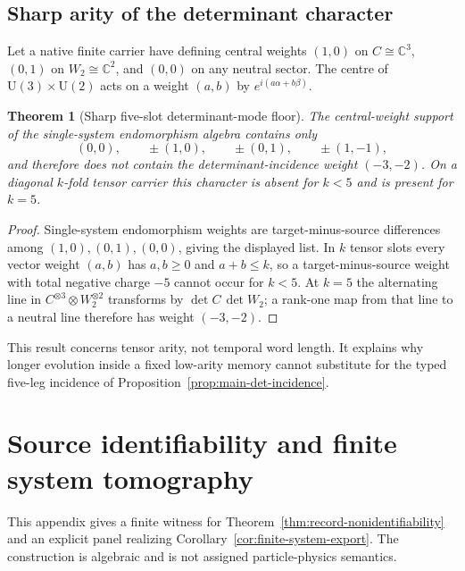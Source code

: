\documentclass[11pt]{article}
\newtheorem{theorem}{Theorem}[section]
\theoremstyle{definition}
\theoremstyle{remark}
\newcommand{\C}{\mathbb C}
\newcommand{\U}{\mathrm U}
\begin{document}
\subsection{Sharp arity of the determinant character}

Let a native finite carrier have defining central weights $(1,0)$ on
$C\cong\C^3$, $(0,1)$ on $W_2\cong\C^2$, and $(0,0)$ on any neutral sector.
The centre of $\U(3)\times\U(2)$ acts on a weight $(a,b)$ by
$e^{i(a\alpha+b\beta)}$.

\begin{theorem}[Sharp five-slot determinant-mode floor]
\label{thm:determinant-arity-floor}
The central-weight support of the single-system endomorphism algebra contains
only
\[
 (0,0),\qquad \pm(1,0),\qquad \pm(0,1),\qquad \pm(1,-1),
\]
and therefore does not contain the determinant-incidence weight $(-3,-2)$.
On a diagonal $k$-fold tensor carrier this character is absent for $k<5$ and
is present for $k=5$.
\end{theorem}

\begin{proof}
Single-system endomorphism weights are target-minus-source differences among
$(1,0),(0,1),(0,0)$, giving the displayed list.  In $k$ tensor slots every
vector weight $(a,b)$ has $a,b\ge0$ and $a+b\le k$, so a target-minus-source
weight with total negative charge $-5$ cannot occur for $k<5$.  At $k=5$ the
alternating line in $C^{\otimes3}\otimes W_2^{\otimes2}$ transforms by
$\det C\,\det W_2$; a rank-one map from that line to a neutral line therefore
has weight $(-3,-2)$.
\end{proof}

This result concerns tensor arity, not temporal word length.  It explains why
longer evolution inside a fixed low-arity memory cannot substitute for the
typed five-leg incidence of Proposition~\ref{prop:main-det-incidence}.

\section{Source identifiability and finite system tomography}
\label{app:source-identifiability}

This appendix gives a finite witness for
Theorem~\ref{thm:record-nonidentifiability} and an explicit panel realizing
Corollary~\ref{cor:finite-system-export}.  The construction is algebraic and
is not assigned particle-physics semantics.
\end{document}
